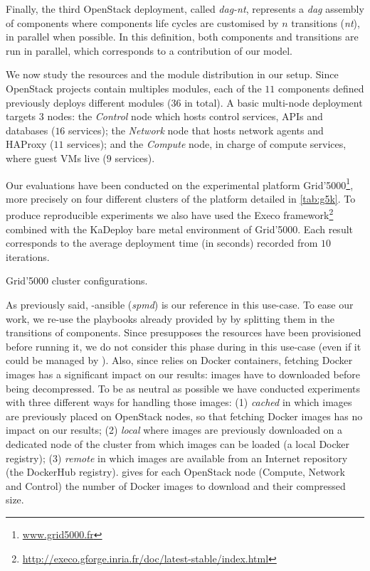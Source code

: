 Finally, the third OpenStack deployment, called \emph{dag-nt}, represents a
\emph{dag} assembly of components where components life cycles are customised by
$n$ transitions (\emph{nt}), in parallel when possible. In this definition, both
components and transitions are run in parallel, which corresponds to a
contribution of our \mad model.

We now study the resources and the module distribution in our setup. Since
OpenStack projects contain multiples modules, each of the $11$ components
defined previously deploys different modules ($36$ in total). A basic multi-node
\kolla deployment targets 3 nodes: the \emph{Control} node which hosts control
services, APIs and databases ($16$ services); the \emph{Network} node that hosts
network agents and HAProxy ($11$ services); and the \emph{Compute} node, in
charge of compute services, where guest VMs live ($9$ services).

Our evaluations have been conducted on the experimental platform
Grid'5000\footnote{\url{www.grid5000.fr}}, more precisely on four different
clusters of the platform detailed in \cref{tab:g5k}. To produce reproducible
experiments we also have used the Execo
framework\footnote{\url{http://execo.gforge.inria.fr/doc/latest-stable/index.html}}
combined with the KaDeploy bare metal environment of Grid'5000. Each result
corresponds to the average deployment time (in seconds) recorded from $10$
iterations.

\begin{table}
  \begin{center}
    \small
    
    \caption{Grid'5000 cluster configurations.}
    \label{tab:g5k}
  \end{center}
\end{table}

As previously said, \kolla-ansible (\ie \emph{spmd}) is our reference in this
use-case.  To ease our work, we re-use the playbooks already provided by \kolla
by splitting them in the transitions of \mad components. Since \kolla presupposes
the resources have been provisioned before running it, we do not consider this
phase during in this use-case (even if it could be managed by \mad).
%
Also, since \kolla relies on Docker containers, fetching Docker images has a
significant impact on our results: images have to downloaded before being
decompressed. To be as neutral as possible we have conducted experiments with
three different ways for handling those images: (1) \emph{cached} in which
images are previously placed on OpenStack nodes, so that fetching Docker images
has no impact on our results; (2) \emph{local} where images are previously
downloaded on a dedicated node of the cluster from which images can be loaded (a
local Docker registry); (3) \emph{remote} in which images are available from an
Internet repository (\ie the DockerHub registry).   gives for
each OpenStack node (\ie Compute, Network and Control) the number of Docker
images to download and their compressed size.

